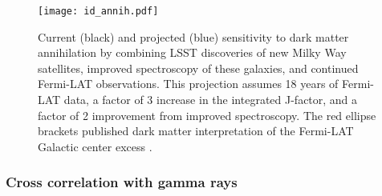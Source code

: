 \begin{figure}
\centering
\texttt{[image: id\_annih.pdf]}
\caption{Current (black) and projected (blue) sensitivity to dark matter annihilation by combining LSST discoveries of new Milky Way satellites, improved spectroscopy of these galaxies, and continued Fermi-LAT observations. This projection assumes 18 years of Fermi-LAT data, a factor of 3 increase in the integrated J-factor, and a factor of 2 improvement from improved spectroscopy. The red ellipse brackets published dark matter interpretation of the Fermi-LAT Galactic center excess \citep[\ie,][]{Gordon:2013, Abazajian:2014}.
\label{fig:indirect}
}
\end{figure}

\subsubsection{Cross correlation with gamma rays }


